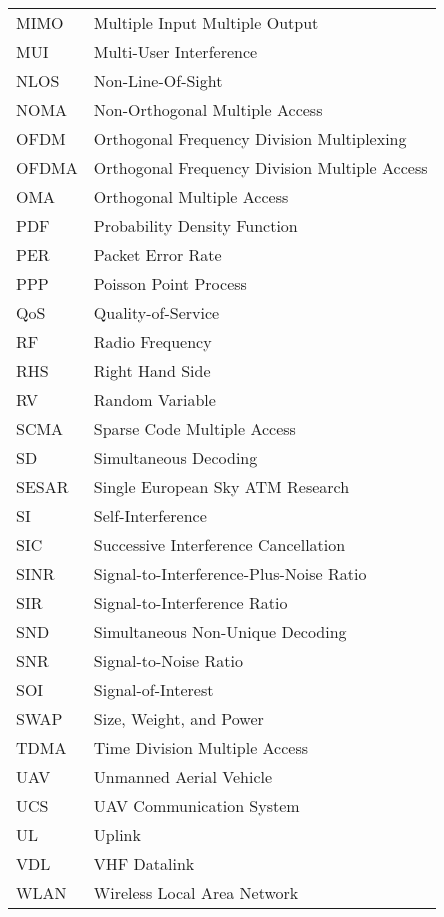 \begin{longtable}{ll}
MIMO	&	Multiple Input Multiple Output									\\
MUI		&	Multi-User Interference													\\
NLOS	&	Non-Line-Of-Sight																\\
NOMA	&	Non-Orthogonal Multiple Access 									\\
OFDM	&	Orthogonal Frequency Division Multiplexing			\\
OFDMA	&	Orthogonal Frequency Division Multiple Access		\\
OMA		&	Orthogonal Multiple Access											\\
PDF		&	Probability Density Function										\\
PER		&	Packet Error Rate																\\
PPP		&	Poisson Point Process														\\
QoS		&	Quality-of-Service															\\
RF		&	Radio Frequency																	\\
RHS		&	Right Hand Side																	\\
RV		&	Random Variable																	\\
SCMA	&	Sparse Code Multiple Access											\\
SD		&	Simultaneous Decoding														\\
SESAR	& Single European Sky ATM Research								\\
SI		&	Self-Interference																\\
SIC		&	Successive Interference Cancellation						\\
SINR	&	Signal-to-Interference-Plus-Noise Ratio					\\
SIR		&	Signal-to-Interference Ratio										\\
SND		&	Simultaneous Non-Unique Decoding 								\\
SNR		&	Signal-to-Noise Ratio														\\
SOI		&	Signal-of-Interest															\\
SWAP	&	Size, Weight, and Power													\\
TDMA	&	Time Division Multiple Access										\\
UAV		&	Unmanned Aerial Vehicle													\\
UCS		&	UAV Communication System												\\
UL		&	Uplink																					\\
VDL		&	VHF Datalink																		\\
WLAN	&	Wireless Local Area Network											\\
\end{longtable}

